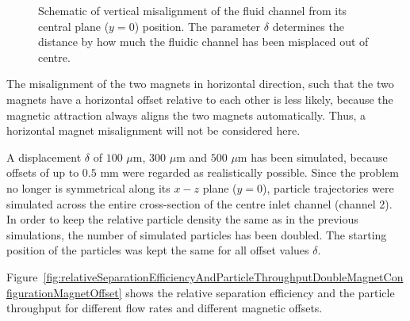\begin{figure}[htb]%
\centering
{}
\caption[Schematic of vertical misalignment of the fluid channel]{Schematic of vertical misalignment of the fluid channel from its central plane ($y=0$) position. The parameter $\delta$ determines the distance by how much the fluidic channel has been misplaced out of centre.}%
\label{fig:doubleMagnetConfigurationMisalignment}%
\end{figure}

The misalignment of the two magnets in horizontal direction, such that the two magnets have a horizontal offset relative to each other is less likely, because the magnetic attraction always aligns the two magnets automatically. Thus, a horizontal magnet misalignment will not be considered here.

A displacement $\delta$ of $100$ $\mu$m, $300$ $\mu$m and $500$ $\mu$m has been simulated, because offsets of up to $0.5$ mm were regarded as realistically possible. Since the problem no longer is symmetrical along its $x-z$ plane ($y=0$), particle trajectories were simulated across the entire cross-section of the centre inlet channel (channel 2). In order to keep the relative particle density the same as in the previous simulations, the number of simulated particles has been doubled. The starting position of the particles was kept the same for all offset values $\delta$. 

Figure~\ref{fig:relativeSeparationEfficiencyAndParticleThroughputDoubleMagnetConfigurationMagnetOffset} shows the relative separation efficiency and the particle throughput for different flow rates and different magnetic offsets.

